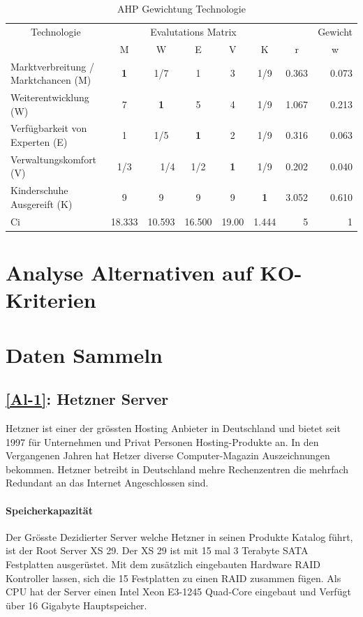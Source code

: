 \begin{table}[htbp]
\caption{AHP Gewichtung Technologie}
\begin{tabular}{|p{3.9cm}|c|c|c|c|c|r|r|}
\hline
\multicolumn{ 1}{|c|}{Technologie} & \multicolumn{ 5}{c|}{Evalutations Matrix} & \multicolumn{1}{l|}{} & \multicolumn{1}{l|}{Gewicht} \\ \cline{ 2- 8}
\multicolumn{ 1}{|c|}{} & M & W & E & V & K & \multicolumn{1}{c|}{r} & \multicolumn{1}{c|}{w} \\ \hline
Marktverbreitung / Marktchancen (M) & \textbf{1} &  1/7 & 1 & 3 &  1/9 & 0.363 & 0.073 \\ \hline
Weiterentwicklung (W) & 7 & \textbf{1} & 5 & 4 &  1/9 & 1.067 & 0.213 \\ \hline
Verfügbarkeit von Experten (E) & 1 &  1/5 & \textbf{1} & 2 &  1/9 & 0.316 & 0.063 \\ \hline
Verwaltungskomfort (V) &  1/3 & \multicolumn{1}{r|}{ 1/4} &  1/2 & \textbf{1} &  1/9 & 0.202 & 0.040 \\ \hline
Kinderschuhe Ausgereift (K) & 9 & 9 & 9 & 9 & \textbf{1} & 3.052 & 0.610 \\ \hline  \hline
Ci & \multicolumn{1}{r|}{18.333} & \multicolumn{1}{r|}{10.593} & \multicolumn{1}{r|}{16.500} & \multicolumn{1}{r|}{19.00} & \multicolumn{1}{r|}{1.444} & 5 & 1 \\ \hline
\end{tabular}
\label{AHPTechnologie}
\end{table}


\section{Analyse Alternativen auf KO-Kriterien}

\section{Daten Sammeln}
\subsection{\ref{Al-1}: Hetzner Server}
Hetzner ist einer der grössten Hosting Anbieter in Deutschland und bietet seit 1997 für Unternehmen und Privat Personen Hosting-Produkte an. In den Vergangenen Jahren hat Hetzer diverse Computer-Magazin Auszeichnungen bekommen. Hetzner betreibt in Deutschland mehre Rechenzentren die mehrfach Redundant an das Internet Angeschlossen sind.

\paragraph{Speicherkapazität}
Der Grösste Dezidierter Server welche Hetzner in seinen Produkte Katalog führt, ist der Root Server XS 29. Der XS 29 ist mit 15 mal 3 Terabyte SATA Festplatten ausgerüstet. Mit dem zusätzlich eingebauten Hardware RAID Kontroller lassen, sich die 15 Festplatten zu einen RAID zusammen fügen.
Als CPU hat der Server einen Intel Xeon E3-1245 Quad-Core eingebaut und Verfügt über 16 Gigabyte Hauptspeicher. 

